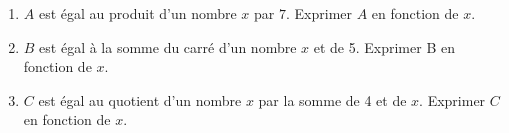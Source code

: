 \documentclass[exercice]{thedocument}%
\begin{document}
%
\begin{enumerate}
    \item $A$ est égal au produit d'un nombre $x$ par $7$. Exprimer $A$ en fonction de $x$.
    \item $B$ est égal à la somme du carré d'un nombre $x$ et de 5. Exprimer B en fonction de $x$.
    \item $C$ est égal au quotient d'un nombre $x$ par la somme de 4 et de $x$. Exprimer $C$ en fonction de $x$.
  \end{enumerate}
\end{document}
